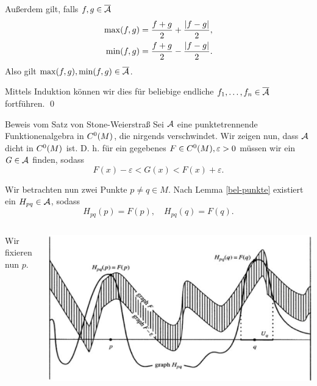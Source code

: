 \begin{frame}
    Außerdem gilt, falls \(f,g \in \overline{\mathcal{A}} \)
    \pause
    \begin{align*}
        \max(f,g) &= \frac{f+g}{2} + \frac{\left|f-g\right|}{2}, \\
        \min(f,g) &= \frac{f+g}{2} - \frac{\left|f-g\right|}{2}.
    \end{align*} 
    \pause
    Also gilt \( \max(f,g), \min(f,g) \in \overline{\mathcal{A}} \). 
    \pause

    Mittels Induktion können wir dies für beliebige endliche
    \( f_1, \ldots, f_n \in \overline{\mathcal{A}} \) fortführen.
    \qed
\end{frame}

\begin{frame}{Beweis vom Satz von Stone-Weierstraß}
    Sei \( \mathcal{A} \) eine punktetrennende Funktionenalgebra in \(C^0(M)\), die nirgends verschwindet. \pause
    Wir zeigen nun, dass \( \mathcal{A} \) dicht in \(C^0(M)\) ist. \pause
    D. h. für ein gegebenes \( F \in C^0(M), \varepsilon > 0 \) 
    müssen wir ein \( G \in \mathcal{A} \) finden, sodass 
    \[ F(x) - \varepsilon < G(x) < F(x) + \varepsilon. \]
    \pause

    Wir betrachten nun zwei Punkte \(p\neq q \in M\).
    Nach Lemma \ref{bel-punkte} existiert ein \(H_{pq} \in \mathcal{A}\), 
    sodass 
    \[ H_{pq}(p) = F(p), \quad H_{pq}(q) = F(q). \]
\end{frame}

\begin{frame}
    \begin{columns}
        \begin{column}{0.4\textwidth}
            Wir fixieren nun \(p\).
        \end{column}
        \begin{column}{0.6\textwidth}
            \includegraphics[width=\textwidth]{images/stone-weierstrass-step1.png}
        \end{column}
    \end{columns}
\end{frame}

